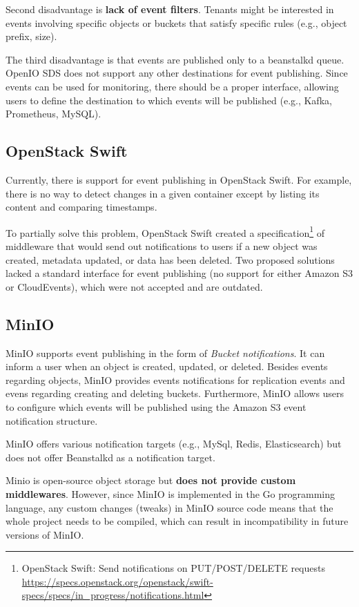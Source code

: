    Second disadvantage is \textbf{lack of event filters}. Tenants might be interested in events involving specific objects or buckets that satisfy specific rules (e.g., object prefix, size).

    The third disadvantage is that events are published only to a beanstalkd queue. OpenIO SDS does not support any other destinations for event publishing. Since events can be used for monitoring, there should be a proper interface, allowing users to define the destination to which events will be published (e.g., Kafka, Prometheus, MySQL).

    \subsection{OpenStack Swift}
    Currently, there is support for event publishing in OpenStack Swift. For example, there is no way to detect changes in a given container except by listing its content and comparing timestamps.

    To partially solve this problem, OpenStack Swift created a specification\footnote{OpenStack Swift: Send notifications on PUT/POST/DELETE requests {\url{https://specs.openstack.org/openstack/swift-specs/specs/in_progress/notifications.html}}} of middleware that would send out notifications to users if a new object was created, metadata updated, or data has been deleted.
    Two proposed solutions\cite{swiftPatch1}\cite{swiftPatch2} lacked a standard interface for event publishing (no support for either Amazon S3 or CloudEvents), which were not accepted and are outdated.

    \subsection{MinIO}
    MinIO supports event publishing in the form of \textit{Bucket notifications}. It can inform a user when an object is created, updated, or deleted. Besides events regarding objects, MinIO provides events notifications for replication events and evens regarding creating and deleting buckets. Furthermore, MinIO allows users to configure which events will be published using the Amazon S3 event notification structure.

    MinIO offers various notification targets (e.g., MySql, Redis, Elasticsearch) but does not offer Beanstalkd as a notification target.

    Minio is open-source object storage but \textbf{does not provide custom middlewares}. However, since MinIO is implemented in the Go programming language, any custom changes (tweaks) in MinIO source code means that the whole project needs to be compiled, which can result in incompatibility in future versions of MinIO.

